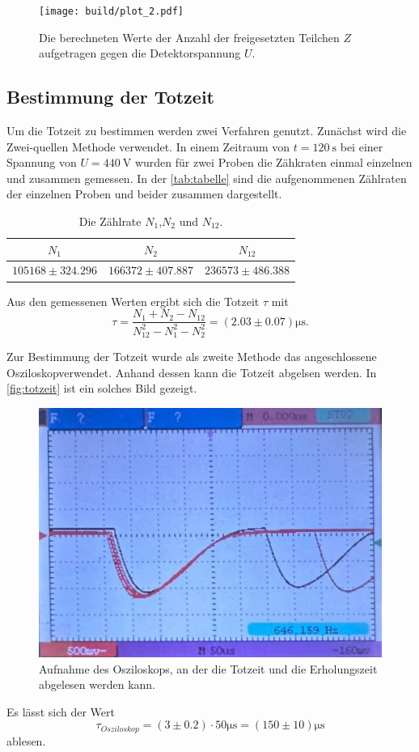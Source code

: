 \begin{figure}[H]
	\texttt{[image: build/plot\_2.pdf]}
	\caption{Die berechneten Werte der Anzahl der freigesetzten Teilchen $Z$ aufgetragen gegen die Detektorspannung $U$.}
	\label{fig:plot_2}
\end{figure}

\subsection{Bestimmung der Totzeit}
\label{sec:Bestimmung der Totzeit}

Um die Totzeit zu bestimmen werden zwei Verfahren genutzt. Zunächst wird die Zwei-quellen Methode
verwendet. In einem Zeitraum von $t = \SI{120}{\second}$ bei einer Spannung von $U = \SI{440}{\volt}$ wurden für zwei Proben
die Zähkraten einmal einzelnen und zusammen gemessen.
In der \autoref{tab:tabelle} sind die aufgenommenen Zählraten der einzelnen Proben und beider zusammen dargestellt.

\begin{table}[H]
    \centering
    \caption{Die Zählrate $N_1$,$N_2$ und $N_{12}$.}
    \label{tab:tabelle}
    \begin{tabular}{c c c}
    \toprule
    $N_1$ & $N_2$ & $N_12$ \\
    \midrule
    $105168 \pm 324.296$ & $166372 \pm 407.887$ &$236573 \pm 486.388$ \\
    \bottomrule
    \end{tabular}
\end{table}

Aus den gemessenen Werten ergibt sich die Totzeit $\tau$ mit
\begin{equation*}
    \tau =\frac{N_1+N_2-N_{12}}{N_{12}^2-N_1^2-N_2^2} = \left(2.03 \pm 0.07\right) \si{\micro\second}.
\end{equation*}

Zur Bestimmung der Totzeit wurde als zweite Methode das angeschlossene Osziloskopverwendet. Anhand dessen kann die Totzeit
abgelsen werden. In \autoref{fig:totzeit} ist ein solches Bild gezeigt.

\begin{figure}[H]
    \centering
	\includegraphics[width=0.5\linewidth]{content/grafik/zeit_1.jpg}
	\caption{Aufnahme des Osziloskops, an der die Totzeit und die Erholungszeit abgelesen werden kann.}
	\label{fig:totzeit}
\end{figure}
Es lässt sich der Wert 
\begin{equation*}
    \tau_{Osziloskop} = \left(3 \pm 0.2 \right) \cdot 50 \si{\micro\second} = \left(150 \pm  10\right) \si{\micro\second}
\end{equation*}
ablesen.
